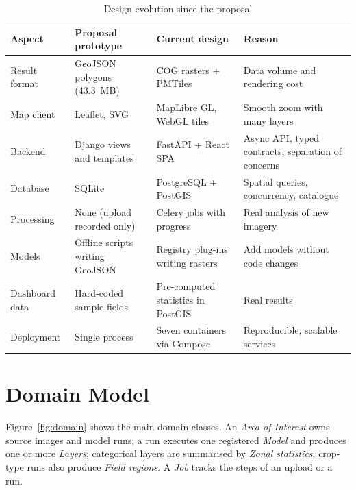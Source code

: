 \begin{table}[htbp]
\centering\small
\caption{Design evolution since the proposal}
\label{tab:evolution}
\begin{tabularx}{\textwidth}{L{2.6cm} L{3.6cm} L{4.0cm} Y}
\toprule
\textbf{Aspect} & \textbf{Proposal prototype} & \textbf{Current design} & \textbf{Reason}\\
\midrule
Result format & GeoJSON polygons (43.3~MB) & COG rasters + PMTiles & Data volume and rendering cost\\
Map client & Leaflet, SVG & MapLibre GL, WebGL tiles & Smooth zoom with many layers\\
Backend & Django views and templates & FastAPI + React SPA & Async API, typed contracts, separation of concerns\\
Database & SQLite & PostgreSQL + PostGIS & Spatial queries, concurrency, catalogue\\
Processing & None (upload recorded only) & Celery jobs with progress & Real analysis of new imagery\\
Models & Offline scripts writing GeoJSON & Registry plug-ins writing rasters & Add models without code changes\\
Dashboard data & Hard-coded sample fields & Pre-computed statistics in PostGIS & Real results\\
Deployment & Single process & Seven containers via Compose & Reproducible, scalable services\\
\bottomrule
\end{tabularx}
\end{table}

\section{Domain Model}
Figure~\ref{fig:domain} shows the main domain classes. An \emph{Area of Interest} owns source images
and model runs; a run executes one registered \emph{Model} and produces one or more \emph{Layers};
categorical layers are summarised by \emph{Zonal statistics}; crop-type runs also produce
\emph{Field regions}. A \emph{Job} tracks the steps of an upload or a run.

